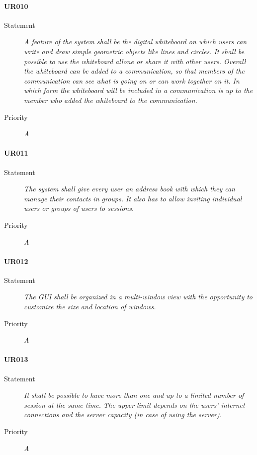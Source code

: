 \paragraph{UR010}
\begin{description}
\item[Statement] \textit{A feature of the system shall be the digital
    whiteboard on which users can write and draw simple geometric objects like
    lines and circles. It shall be possible to use the whiteboard allone or
    share it with other users. Overall the whiteboard can be added to a
    communication, so that members of the communication can see what is going on
    or can work together on it. In which form the whiteboard will be included
    in a communication is up to the member who added the whiteboard to the
    communication.}
\item[Priority] \textit{A}
\end{description}

\paragraph{UR011}
\begin{description}
\item[Statement] \textit{The system shall give every user an address book
    with which they can manage their contacts in groups. It also has to allow
    inviting individual users or groups of users to sessions.}
\item[Priority] \textit{A}
\end{description}

\paragraph{UR012}
\begin{description}
\item[Statement] \textit{The \gls{GUI} shall be organized in a multi-window
    view with the opportunity to customize the size and location of windows.}
\item[Priority] \textit{A}
\end{description}

\paragraph{UR013}
\begin{description}
\item[Statement] \textit{It shall be possible to have more than one and up to
    a limited number of \gls{session} at the same time. The upper limit
    depends on the users' internet-connections and the server capacity (in case
    of using the server).}
\item[Priority] \textit{A}
\end{description}

